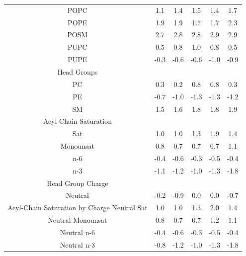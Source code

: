 \documentclass[12pt]{ruthesis_nofloat}
\begin{document}
\begin{table}
{\begin{tabular}{| c || ccccc |}
POPC    &1.1&1.4&1.5&1.4&1.7\\
POPE    &1.9&1.9&1.7&1.7&2.3\\
POSM    &2.7&2.8&2.8&2.9&2.9\\
PUPC    &0.5&0.8&1.0&0.8&0.5\\
PUPE    &-0.3&-0.6&-0.6&-1.0&-0.9\\
\hline
Head Groups &&&&&\\
PC      &0.3&0.2&0.8&0.8&0.3\\
PE      &-0.7&-1.0&-1.3&-1.3&-1.2\\
SM      &1.5&1.6&1.8&1.8&1.9\\
\hline
Acyl-Chain Saturation &&&&&\\
Sat      &1.0&1.0&1.3&1.9&1.4\\
Monounsat      &0.8&0.7&0.7&0.7&1.1\\
n-6&-0.4&-0.6&-0.3&-0.5&-0.4\\
n-3&-1.1&-1.2&-1.0&-1.3&-1.8\\
\hline
Head Group Charge &&&&&\\
Neutral &-0.2&-0.9&0.0&0.0&-0.7\\
\hline
Acyl-Chain Saturation by Charge 
Neutral Sat    &1.0&1.0&1.3&2.0&1.4\\
Neutral Monounsat    &0.8&0.7&0.7&1.2&1.1\\
Neutral n-6&-0.4&-0.6&-0.3&-0.5&-0.4\\
Neutral n-3&-0.8&-1.2&-1.0&-1.3&-1.8\\
\hline
\end{tabular}}
\end{table}
\end{document}
